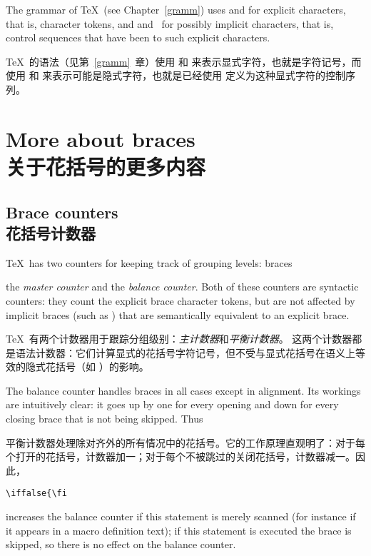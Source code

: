 The grammar of \TeX\ (see Chapter~\ref{gramm})  uses
 and  for explicit
characters, that is, character tokens,
and \n{\lb} and~\n{\rb} 
for possibly implicit characters,
\altt
that is, control sequences that have been  to such
explicit characters.

\TeX\ 的语法（见第~\ref{gramm}~章）使用  和  来表示显式字符，也就是字符记号，而使用 \n{\lb} 和 \n{\rb} 来表示可能是隐式字符，也就是已经使用  定义为这种显式字符的控制序列。 



\section{More about braces\\关于花括号的更多内容}


\subsection{Brace counters\\花括号计数器}

\TeX\ has two counters for keeping  track of grouping levels:
\term braces\par
the {\it master counter} and the {\it balance counter}.
Both of these counters are syntactic counters: they count the
explicit brace character tokens, but are not affected by implicit
braces (such as ) that are semantically equivalent
to an explicit brace.

\TeX\ 有两个计数器用于跟踪分组级别：{\it 主计数器}和{\it 平衡计数器}。
这两个计数器都是语法计数器：它们计算显式的花括号字符记号，但不受与显式花括号在语义上等效的隐式花括号（如 ）的影响。

The balance counter handles braces in all cases except in
alignment. Its workings are intuitively clear: it goes up
by one for every opening and down for every closing
brace that is not being skipped. Thus

平衡计数器处理除对齐外的所有情况中的花括号。它的工作原理直观明了：对于每个打开的花括号，计数器加一；对于每个不被跳过的关闭花括号，计数器减一。因此，
\begin{verbatim}
\iffalse{\fi
\end{verbatim}
increases the balance counter if
this statement is merely scanned (for instance if it
appears in a macro definition text); if this statement
is executed the brace is skipped, so there is no effect on
the balance counter.

